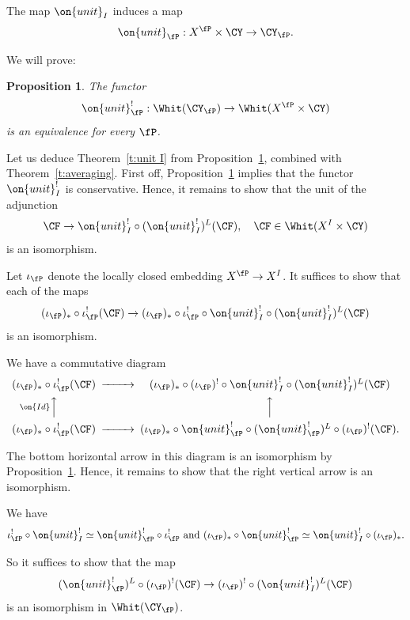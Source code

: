 \documentclass[9pt]{amsart}
\newtheorem{prop}[subsubsection]{Proposition}
\theoremstyle{definition}
\theoremstyle{remark}
\newcommand{\thmref}[1]{Theorem~\ref{#1}}
\newcommand{\propref}[1]{Proposition~\ref{#1}}
\numberwithin{equation}{section}
\begin{document}
The map $\on{unit}_I$ induces a map
$$\on{unit}_\fP:X^\fP\times \CY\to \CY_\fP.$$

We will prove:

\begin{prop} \label{p:unit beta}
The functor
$$\on{unit}_\fP^!:\Whit(\CY_\fP)\to \Whit(X^\fP\times \CY)$$
is an equivalence for every $\fP$. 
\end{prop}

\sssec{}

Let us deduce \thmref{t:unit I} from \propref{p:unit beta}, combined with \thmref{t:averaging}. First off, \propref{p:unit beta}
implies that the functor $\on{unit}_I^!$ is conservative. Hence, it remains to show that the unit of the adjunction
$$\CF\to \on{unit}_I^! \circ (\on{unit}_I^!)^L(\CF), \quad \CF\in \Whit(X^I\times \CY)$$
is an isomorphism. 
 
 \medskip

Let $\iota_\fP$ denote the locally closed embedding $X^\fP\to X^I$. It suffices to show that
each of the maps
$$(\iota_\fP)_*\circ \iota_\fP^!(\CF) \to (\iota_\fP)_*\circ \iota_\fP^!\circ 
\on{unit}_I^! \circ (\on{unit}_I^!)^L(\CF)$$
is an isomorphism.

\medskip

We have a commutative diagram
$$
\CD
(\iota_\fP)_*\circ \iota_\fP^!(\CF)  @>>>  (\iota_\fP)_*\circ (\iota_\fP)^!\circ  \on{unit}_I^! \circ (\on{unit}_I^!)^L(\CF) \\ 
@A{\on{Id}}AA    @AAA   \\
(\iota_\fP)_*\circ \iota_\fP^!(\CF)  @>>>   (\iota_\fP)_*\circ \on{unit}_\fP^! \circ (\on{unit}_\fP^!)^L\circ (\iota_\fP)^!(\CF). 
\endCD
$$

The bottom horizontal arrow in this diagram is an isomorphism by \propref{p:unit beta}. Hence, it remains to show that the
right vertical arrow is an isomorphism. 

\medskip

We have
$$\iota_\fP^!\circ  \on{unit}_I^! \simeq \on{unit}_\fP^! \circ \iota_\fP^!
\text{ and }
(\iota_\fP)_*\circ  \on{unit}_\fP^! \simeq \on{unit}_I^! \circ (\iota_\fP)_*.$$

So it suffices to show that the map 
$$(\on{unit}_\fP^!)^L\circ (\iota_\fP)^!(\CF)\to (\iota_\fP)^! \circ (\on{unit}_I^!)^L(\CF)$$
is an isomorphism in $\Whit(\CY_\fP)$.

\medskip
\end{document}
